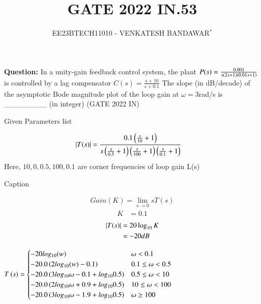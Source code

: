\documentclass[journal,12pt,twocolumn]{IEEEtran}
\theoremstyle{remark}
\begin{document}

\vspace{3cm}

\title{GATE 2022 IN.53}
\author{EE23BTECH11010 - VENKATESH BANDAWAR$^{*}$%
}
\maketitle
\newpage
\bigskip
\textbf{Question:} In a unity-gain feedback control system, the plant
$P(s) = \frac{0.001}{s\left(2s+1\right)\left(0.01s+1\right)}$
is controlled by a lag compensator
$C(s) = \frac{s+10}{s+0.1}$
The slope (in dB/decade) of the asymptotic Bode magnitude plot of the loop gain
at $\omega= 3 $rad/s is \_\_\_\_\_\_\_\_ (in integer)
\hfill(GATE 2022 IN)\\
\solution
\begin{table}[!h]
    \centering
    
    \caption{Given Parameters list}
    \label{tab:Given Parameters list.gate2022.IN.53}
\end{table}
\begin{align}
    \left\vert T(s)\right\vert &= \frac{0.1\left(\frac{s}{10}+1\right)}{s\left(\frac{s}{0.5}+1\right)\left(\frac{s}{100}+1\right)\left(\frac{s}{0.1}+1\right)}\label{eqn of loop gain.gate2022.IN.53}
\end{align}
Here, $10,0,0.5,100,0.1$ are corner frequencies of loop gain L(s) 

\begin{table}[!h]
    \centering
    
    \caption{Caption}
    \label{tab:corner frequency.gate2022.IN.53}
\end{table}

\begin{align}
    Gain(K) = \lim_{s\rightarrow 0} sT(s)
\end{align}
\begin{align}
    K &= 0.1
\end{align}
\begin{align}
    \left\vert T(s)\right\vert &= 20\log_{10} K\\
    &= -20 dB
\end{align}

$T\left(s\right) = \begin{cases} 
    -20 log_{10}(w) &  \omega < 0.1 \\
    -20.0 \left(2log_{10}(w) - 0.1\right)  &  0.1 \leq \omega < 0.5 \\
    -20.0 \left(3log_{10}{\omega} - 0.1 + log_{10}{0.5}\right)  &  0.5 \leq \omega < 10 \\
    -20.0 \left(2log_{10}{\omega} + 0.9 + log_{10}{0.5}\right)  &  10 \leq \omega < 100 \\
    -20.0 \left(3log_{10}{\omega} - 1.9 + log_{10}{0.5}\right)  &  \omega \geq 100 \\
\end{cases}$
\end{document}
